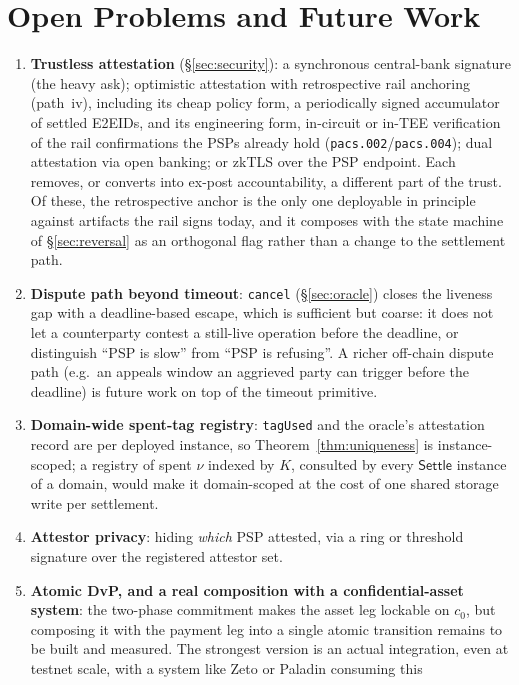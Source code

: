 \documentclass[11pt]{article}
\newcommand{\code}[1]{\texttt{#1}}
\begin{document}
\section{Open Problems and Future Work}
\label{sec:futurework}

\begin{enumerate}
\item \textbf{Trustless attestation} (\S\ref{sec:security}): a synchronous
central-bank signature (the heavy ask); optimistic attestation with
retrospective rail anchoring (path~iv), including its cheap policy form, a
periodically signed accumulator of settled E2EIDs, and its engineering form,
in-circuit or in-TEE verification of the rail confirmations the PSPs already
hold (\code{pacs.002}/\code{pacs.004}); dual attestation via open banking; or
zkTLS over the PSP endpoint. Each removes, or converts into ex-post
accountability, a different part of the trust. Of these, the retrospective
anchor is the only one deployable in principle against artifacts the rail signs
today, and it composes with the state machine of \S\ref{sec:reversal} as an
orthogonal flag rather than a change to the settlement path.
\item \textbf{Dispute path beyond timeout}: \code{cancel} (\S\ref{sec:oracle})
closes the liveness gap with a deadline-based escape, which is sufficient but
coarse: it does not let a counterparty contest a still-live operation before
the deadline, or distinguish ``PSP is slow'' from ``PSP is refusing''. A richer
off-chain dispute path (e.g.\ an appeals window an aggrieved party can trigger
before the deadline) is future work on top of the timeout primitive.
\item \textbf{Domain-wide spent-tag registry}: \code{tagUsed} and the oracle's
attestation record are per deployed instance, so Theorem~\ref{thm:uniqueness}
is instance-scoped; a registry of spent $\nu$ indexed by $K$, consulted by
every $\mathsf{Settle}$ instance of a domain, would make it domain-scoped at
the cost of one shared storage write per settlement.
\item \textbf{Attestor privacy}: hiding \emph{which} PSP attested, via a ring or
threshold signature over the registered attestor set.
\item \textbf{Atomic DvP, and a real composition with a confidential-asset
system}: the two-phase commitment makes the asset leg lockable on $c_0$, but
composing it with the payment leg into a single atomic transition remains to be
built and measured. The strongest version is an actual integration, even at
testnet scale, with a system like Zeto or Paladin consuming this

\end{enumerate}
\end{document}
